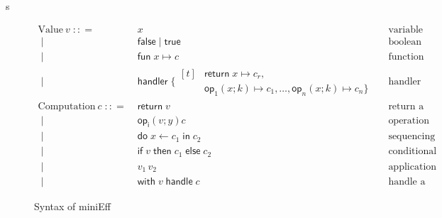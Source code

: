 s\documentclass{amsart}
\newcommand{\op}[1]{\mathsf{op}_{#1}} %
\newcommand{\kode}[1]{\mathsf{#1}}
\newcommand{\seq}[2]{\kode{do}\; #1 \leftarrow #2 \;\kode{in}\;}
\newcommand{\conditional}[3]{\kode{if}\; #1 \;\kode{then}\; #2 \;\kode{else}\; #3}
\newcommand{\fun}[1]{\kode{fun}\; #1 \mapsto}
\newcommand{\handler}{\kode{handler}\;}
\newcommand{\opcall}[3]{\kode{#1}(#2; #3)}
\newcommand{\opclause}[3]{#1(#2; #3) \mapsto}
\newcommand{\return}[1]{\kode{return}\;#1}
\newcommand{\retclause}[1]{\return{#1} \mapsto}
\newcommand{\withhandle}[2]{\kode{with}\; #1\; \kode{handle}\; #2}
\begin{document}
\begin{figure}[ht]
  \centering
  \parbox{0.75\textwidth}{
    \newcommand{\bnfis}{\mathrel{\;{:}{:}\!=}\;}
    \newcommand{\bnfor}{\mathrel{\;\big|\;}}
    \begin{align*}
      \text{Value}\ v
        \bnfis& x                                & & \text{variable} \\
        \bnfor& \kode{false} \bnfor \kode{true}  & & \text{boolean constant} \\
        \bnfor& \fun{x} c                        & & \text{function} \\
        \bnfor&
          \handler \{
          \begin{aligned}[t]
            & \retclause{x} c_r, \\
            & \opclause{\op{1}}{x}{k} c_1, \ldots, \opclause{\op{n}}{x}{k} c_n\}
          \end{aligned}
          & & \text{handler}
      \\
      \text{Computation}\ c
        \bnfis& \return{v}                       & & \text{return a value} \\
        \bnfor& \opcall{\op{i}}{v}{y}{c}         & & \text{operation call} \\
        \bnfor& \seq{x}{c_1} c_2                 & & \text{sequencing} \\
        \bnfor& \conditional{v}{c_1}{c_2}        & & \text{conditional} \\
        \bnfor& v_1 \, v_2                       & & \text{application} \\
        \bnfor& \withhandle{v}{c}                & & \text{handle a computation}
    \end{align*}
  }
  \caption{Syntax of miniEff}
  \label{fig:mini-eff}
\end{figure}



\end{document}
